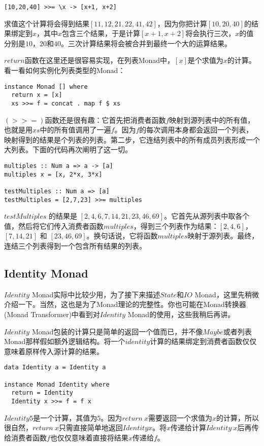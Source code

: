 \begin{lstlisting}
[10,20,40] >>= \x -> [x+1, x+2]
\end{lstlisting}

求值这个计算将会得到结果$[11,12,21,22,41,42]$，因为你把计算$[10,20,40]$的结果绑定到$x$，其中$x$包含三个结果，于是计算$[x+1, x+2]$将会执行三次，$x$的值分别是$10$，$20$和$40$。三次计算结果将会被合并到最终一个大的运算结果。

$return$函数在这里还是很容易实现，在列表Monad中，$[x]$是个求值为$x$的计算。看一看如何实例化列表类型的Monad：

\begin{lstlisting}
instance Monad [] where
  return x = [x]
  xs >>= f = concat . map f $ xs
\end{lstlisting}

$(>>=)$函数还是很有趣：它首先把消费者函数$f$映射到源列表中的所有值，也就是用$xs$中的所有值调用了一遍$f$。因为$f$的每次调用本身都会返回一个列表，映射得到的结果是个列表的列表。第二步，它连结列表中的所有成员列表形成一个大列表。下面的代码再次阐明了这一切。

\begin{lstlisting}
multiples :: Num a => a -> [a]
multiples x = [x, 2*x, 3*x]

testMultiples :: Num a => [a]
testMultiples = [2,7,23] >>= multiples
\end{lstlisting}

$testMultiples$ 的结果是 $[2,4,6,7,14,21,23,46,69]$。它首先从源列表中取各个值，然后将它们传入消费者函数$multiples$，得到三个列表作为结果：$[2,4,6]$， $[7,14,21]$ 和 $[23,46,69]$。换句话说，它将函数$multiples$映射于源列表。最终，连结三个列表得到一个包含所有结果的列表。

\subsection{Identity Monad}

$Identity$ Monad实际中比较少用，为了接下来描述$State$和$IO$ Monad，这里先稍微介绍一下。当然，这也是为了Monad理论的完整性。你也可能在Monad转换器(Monad Transformer)中看到对$Identity$ Monad的使用，这些我稍后再讲。

$Identity$ Monad包装的计算只是简单的返回一个值而已，并不像$Maybe$或者列表Monad那样假如额外逻辑结构。将一个$identity$计算的结果绑定到消费者函数仅仅意味着原样传入源计算的结果。

\begin{lstlisting}
data Identity a = Identity a

instance Monad Identity where
  return = Identity
  Identity x >>= f = f x
\end{lstlisting}

$Identity 5$是一个计算，其值为$5$。因为$return\ x$需要返回一个求值为$x$的计算，所以很自然，$return\ x$只需直接简单地返回$Identity x$。将$x$传递给计算$Identity\ x$后再传给消费者函数$f$也仅仅意味着直接将结果$x$传递给$f$。
